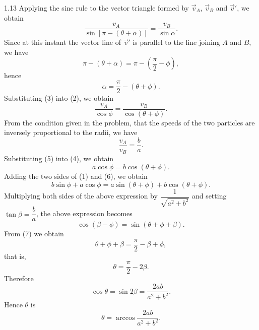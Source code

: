 \begin{solution}{1.13}
Applying the sine rule to the vector triangle formed by $\vec{v}_A$, $\vec{v}_B$ and $\vec{v}'$, we obtain
\begin{equation}
\frac{v_A}{\sin[\pi-(\theta+\alpha)]}=\frac{v_B}{\sin\alpha}. \tag{2}
\end{equation}
Since at this instant the vector line of $\vec{v}'$ is parallel to the line joining $A$ and $B$, we have
\[
\pi-(\theta+\alpha)=\pi-\left(\frac{\pi}{2}-\phi\right),
\]
hence
\begin{equation}
\alpha=\frac{\pi}{2}-(\theta+\phi). \tag{3}
\end{equation}
Substituting (3) into (2), we obtain
\begin{equation}
\frac{v_A}{\cos\phi}=\frac{v_B}{\cos(\theta+\phi)}. \tag{4}
\end{equation}
From the condition given in the problem, that the speeds of the two particles are inversely proportional to the radii, we have
\begin{equation}
\frac{v_A}{v_B}=\frac{b}{a}. \tag{5}
\end{equation}
Substituting (5) into (4), we obtain
\begin{equation}
a\cos\phi=b\cos(\theta+\phi). \tag{6}
\end{equation}
Adding the two sides of (1) and (6), we obtain
\[
b\sin\phi+a\cos\phi=a\sin(\theta+\phi)+b\cos(\theta+\phi).
\]
Multiplying both sides of the above expression by $\dfrac{1}{\sqrt{a^2+b^2}}$ and setting $\tan\beta=\dfrac{b}{a}$, the above expression becomes
\begin{equation}
\cos(\beta-\phi)=\sin(\theta+\phi+\beta). \tag{7}
\end{equation}
From (7) we obtain
\[
\theta+\phi+\beta=\frac{\pi}{2}-\beta+\phi,
\]
that is,
\[
\theta=\frac{\pi}{2}-2\beta.
\]
Therefore
\[
\cos\theta=\sin2\beta=\frac{2ab}{a^2+b^2}.
\]
Hence $\theta$ is
\[
\theta=\arccos\frac{2ab}{a^2+b^2}.
\]
\end{solution}

